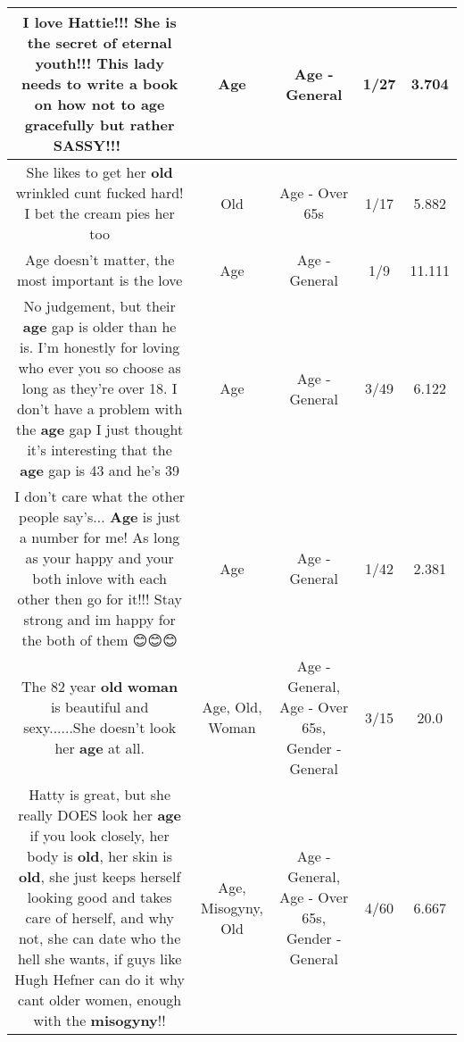 \documentclass[11pt]{article}
\newlength\mylength
\begin{document}
\begin{center}
\begin{longtable}{|C{.65\mylength}|C{.30\mylength}|C{.12\mylength}|C{.12\mylength}|C{.12\mylength}|}
  \small I love Hattie!!! She is the secret of eternal youth!!! This lady needs to write a book on how not to \textbf{age} gracefully but rather SASSY!!! 🙏👏🏼👍🏼\normalsize   & Age & Age - General & 1/27 & 3.704 \\  \hline
  \small She likes to get her \textbf{old} wrinkled cunt fucked hard! I bet the cream pies her too\normalsize   & Old & Age - Over 65s & 1/17 & 5.882 \\  \hline
  \small Age doesn't matter, the most important is the love\normalsize   & Age & Age - General & 1/9 & 11.111 \\  \hline
  \small No judgement, but their \textbf{age} gap is older than he is. I'm honestly for loving who ever you so choose as long as they're over 18. I don't have a problem with the \textbf{age} gap I just thought it's interesting that the \textbf{age} gap is 43 and he's 39\normalsize   & Age & Age - General & 3/49 & 6.122 \\  \hline
  \small I don't care what the other people say's... \textbf{Age} is just a number for me! As long as your happy and your both inlove with each other then go for it!!! Stay strong and im happy for the both of them 😊😊😊\normalsize   & Age & Age - General & 1/42 & 2.381 \\  \hline
  \small The 82 year \textbf{old} \textbf{woman} is beautiful and sexy......She doesn't look her \textbf{age} at all.\normalsize   & Age, Old, Woman & Age - General, Age - Over 65s, Gender - General & 3/15 & 20.0 \\  \hline
  \small Hatty is great, but she really DOES look her \textbf{age} if you look closely, her body is \textbf{old}, her skin is \textbf{old}, she just keeps herself looking good and takes care of herself, and why not, she can date who the hell she wants, if guys like Hugh Hefner can do it why cant older women, enough with the \textbf{misogyny}!!\normalsize   & Age, Misogyny, Old & Age - General, Age - Over 65s, Gender - General & 4/60 & 6.667 \\  \hline

\end{longtable}
\end{center}
\end{document}
